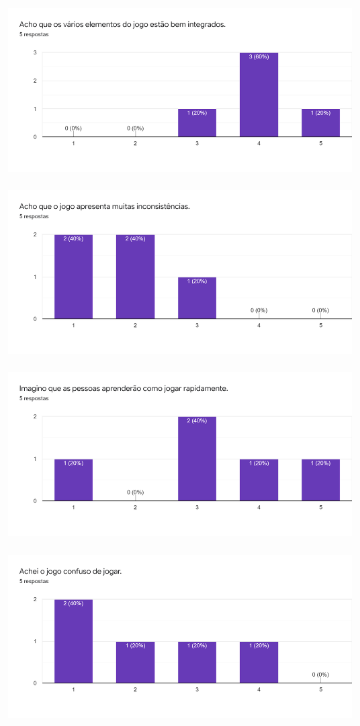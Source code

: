 \begin{figure}[h!]
\begin{subfigure}[b]{0.49\linewidth}
  \end{subfigure}
  \begin{subfigure}[b]{0.49\linewidth}
    \includegraphics[width=\linewidth]{forms5.png}
  \end{subfigure}
  \begin{subfigure}[b]{0.49\linewidth}
    \includegraphics[width=\linewidth]{forms6.png}
  \end{subfigure}
  \begin{subfigure}[b]{0.49\linewidth}
    \includegraphics[width=\linewidth]{forms7.png}
  \end{subfigure}
  \begin{subfigure}[b]{0.49\linewidth}
    \includegraphics[width=\linewidth]{forms8.png}

\end{subfigure}
\end{figure}

